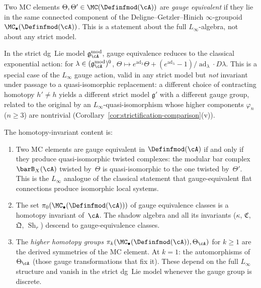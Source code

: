 \begin{remark}
\label{rem:gauge-equivalence-linfty}
Two MC elements $\Theta, \Theta' \in
\MC(\Definfmod(\cA))$ are \emph{gauge equivalent} if they
lie in the same connected component of the
Deligne--Getzler--Hinich $\infty$-groupoid
$\MC_\bullet(\Definfmod(\cA))$.  This is a statement about the
full $L_\infty$-algebra, not about any strict model.

In the strict dg~Lie model
$\mathfrak{g}_\cA^{\mathrm{mod}}$, gauge equivalence reduces
to the classical exponential action: for
$\lambda \in (\mathfrak{g}_\cA^{\mathrm{mod}})^0$,
$\Theta \mapsto e^{\operatorname{ad}_\lambda}\Theta
+ (e^{\operatorname{ad}_\lambda} - 1)/\operatorname{ad}_\lambda
\cdot D\lambda$.
This is a special case of the $L_\infty$ gauge action, valid
in any strict model but \emph{not} invariant under passage to a
quasi-isomorphic replacement: a different choice of contracting
homotopy $h' \neq h$ yields a different strict model
$\mathfrak{g}'$ with a different gauge group, related to the
original by an $L_\infty$-quasi-isomorphism whose higher
components $\varphi_n$ ($n \geq 3$) are nontrivial
(Corollary~\ref{cor:strictification-comparison}(v)).

The homotopy-invariant content is:
\begin{enumerate}[label=\textup{(\alph*)}]
\item Two MC elements are gauge equivalent in
  $\Definfmod(\cA)$ if and only if they produce
  quasi-isomorphic twisted complexes: the modular bar complex
  $\barB_X(\cA)$ twisted by~$\Theta$ is quasi-isomorphic to the
  one twisted by~$\Theta'$.  This is the $L_\infty$ analogue
  of the classical statement that gauge-equivalent flat
  connections produce isomorphic local systems.
\item The set $\pi_0(\MC_\bullet(\Definfmod(\cA)))$ of gauge
  equivalence classes is a homotopy invariant
  of~$\cA$.  The shadow algebra and all its invariants
  ($\kappa$, $\mathfrak{C}$, $\mathfrak{Q}$,
  $\operatorname{Sh}_r$) descend to gauge-equivalence classes.
\item The \emph{higher homotopy groups}
  $\pi_k(\MC_\bullet(\Definfmod(\cA)), \Theta_\cA)$ for
  $k \geq 1$ are the derived symmetries of the MC element.
  At $k = 1$: the automorphisms of $\Theta_\cA$ (those gauge
  transformations that fix it).
  These depend on the full $L_\infty$ structure and vanish
  in the strict dg~Lie model whenever the gauge group is
  discrete.
\end{enumerate}
\end{remark}

